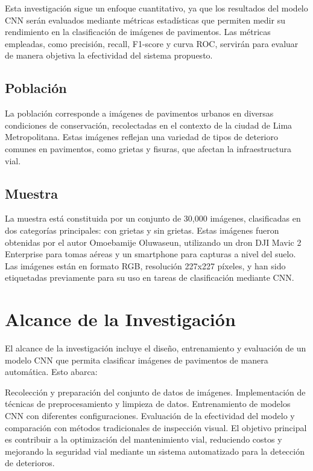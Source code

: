 Esta investigación sigue un enfoque cuantitativo, ya que los resultados del modelo CNN serán evaluados mediante métricas estadísticas que permiten medir su rendimiento en la clasificación de imágenes de pavimentos. Las métricas empleadas, como precisión, recall, F1-score y curva ROC, servirán para evaluar de manera objetiva la efectividad del sistema propuesto.

\subsection{Población}

La población corresponde a imágenes de pavimentos urbanos en diversas condiciones de conservación, recolectadas en el contexto de la ciudad de Lima Metropolitana. Estas imágenes reflejan una variedad de tipos de deterioro comunes en pavimentos, como grietas y fisuras, que afectan la infraestructura vial.

\subsection{Muestra}

La muestra está constituida por un conjunto de 30,000 imágenes, clasificadas en dos categorías principales: con grietas y sin grietas. Estas imágenes fueron obtenidas por el autor Omoebamije Oluwaseun, utilizando un dron DJI Mavic 2 Enterprise para tomas aéreas y un smartphone para capturas a nivel del suelo. Las imágenes están en formato RGB, resolución 227x227 píxeles, y han sido etiquetadas previamente para su uso en tareas de clasificación mediante CNN.

\section{Alcance de la Investigación}

El alcance de la investigación incluye el diseño, entrenamiento y evaluación de un modelo CNN que permita clasificar imágenes de pavimentos de manera automática. Esto abarca:

Recolección y preparación del conjunto de datos de imágenes.
Implementación de técnicas de preprocesamiento y limpieza de datos.
Entrenamiento de modelos CNN con diferentes configuraciones.
Evaluación de la efectividad del modelo y comparación con métodos tradicionales de inspección visual.
El objetivo principal es contribuir a la optimización del mantenimiento vial, reduciendo costos y mejorando la seguridad vial mediante un sistema automatizado para la detección de deterioros.
